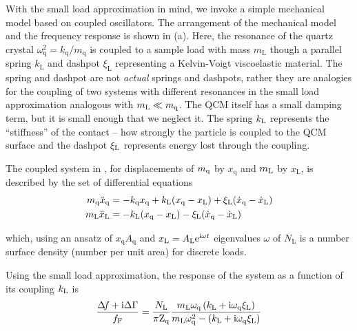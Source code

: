 With the small load approximation in mind, we invoke a simple mechanical
model based on coupled oscillators.  The arrangement of the mechanical
model and the frequency response is shown in
(a).
Here, the resonance of the quartz crystal
$\omega_\mathrm{q}^2=k_\mathrm{q}/m_\mathrm{q}$ is coupled to a sample load
with mass $m_\mathrm{L}$ though a parallel spring $k_\mathrm{L}$ and
dashpot $\xi_\mathrm{L}$ representing a Kelvin-Voigt viscoelastic material.
The spring and dashpot are not \textit{actual} springs and dashpots, rather
they are analogies for the coupling of two systems with different
resonances in the small load approximation analogous with $m_\mathrm{L}\ll m_\mathrm{q}$.  The
QCM itself has a small damping term, but it is small enough that we neglect
it.  The spring $k_\mathrm{L}$ represents the ``stiffness'' of the contact -- how
strongly the particle is coupled to the QCM surface and the dashpot $\xi_\mathrm{L}$
represents energy lost through the coupling.  

The coupled system in , for displacements of
$m_\mathrm{q}$ by $x_\mathrm{q}$ and $m_\mathrm{L}$ by $x_\mathrm{L}$, is described by the
set of differential equations
\begin{align}
 m_\mathrm{q} \ddot{x}_\mathrm{q} &= -k_\mathrm{q} x_\mathrm{q} +k_\mathrm{L} (x_\mathrm{q}-x_\mathrm{L}) + \xi_\mathrm{L} (\dot{x}_\mathrm{q}-\dot{x}_\mathrm{L})\\
 m_\mathrm{L} \ddot{x}_\mathrm{L} &= -k_\mathrm{L} (x_\mathrm{q}-x_\mathrm{L}) - \xi_\mathrm{L} (\dot{x}_\mathrm{q}-\dot{x}_\mathrm{L})
\end{align}

which, using an ansatz of
$x_\mathrm{q}A_\mathrm{q}$ and $x_\mathrm{L}=A_\mathrm{L}{\mathrm{e}}^{{\mathrm{i}} \omega t}$
eigenvalues $\omega$ of
$N_\mathrm{L}$ is a number surface density (number per unit area) for discrete
loads.

Using the small load approximation, the response of the system
as a function of its coupling $k_\mathrm{L}$ is
\begin{equation}
\frac{\Delta\!f + {\mathrm{i}} \Delta \Gamma}{f_\mathrm{F}} = \frac{N_\mathrm{L}}{\pi
\mathrm{Z}_\mathrm{q}}
\frac{m_\mathrm{L} \omega_\mathrm{q} \left( k_\mathrm{L} + {\mathrm{i}}
\omega_\mathrm{q} \xi_\mathrm{L}\right) }
{m_\mathrm{L} \omega_\mathrm{q}^2 - \left(k_\mathrm{L} + {\mathrm{i}}
\omega_\mathrm{q} \xi_\mathrm{L}\right)}
\label{eqn:suppmastereq}
\end{equation}

